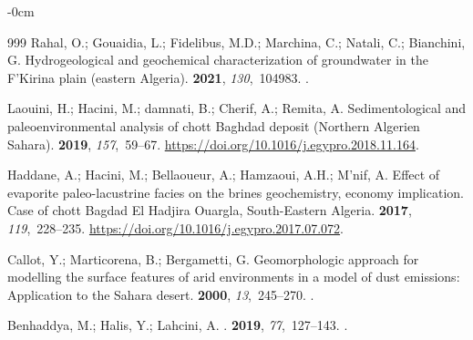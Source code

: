 \documentclass[asi,article,accept,pdftex,moreauthors]{Definitions/mdpi}
\begin{document}
\begin{adjustwidth}{-\extralength}{0cm}
\begin{thebibliography}{999}
Rahal, O.; Gouaidia, L.; Fidelibus, M.D.; Marchina, C.; Natali, C.; Bianchini,
  G.
\newblock Hydrogeological and geochemical characterization of groundwater in
  the F'Kirina plain (eastern Algeria).
 {\bf 2021}, {\em 130},~104983.
.

Laouini, H.; Hacini, M.; damnati, B.; Cherif, A.; Remita, A.
\newblock Sedimentological and paleoenvironmental analysis of chott Baghdad
  deposit (Northern Algerien Sahara).
 {\bf 2019}, {\em 157},~59--67. %
  {\url{https://doi.org/10.1016/j.egypro.2018.11.164}}.

Haddane, A.; Hacini, M.; Bellaoueur, A.; Hamzaoui, A.H.; M'nif, A.
\newblock Effect of evaporite paleo-lacustrine facies on the brines
  geochemistry, economy implication. Case of chott Bagdad El Hadjira Ouargla,
  South-Eastern Algeria.
 {\bf 2017}, {\em 119},~228--235. %
   {\url{https://doi.org/10.1016/j.egypro.2017.07.072}}.

Callot, Y.; Marticorena, B.; Bergametti, G.
\newblock Geomorphologic approach for modelling the surface features of arid
  environments in a model of dust emissions: Application to the Sahara desert.
 {\bf 2000}, {\em 13},~245--270.
.

Benhaddya, M.; Halis, Y.; Lahcini, A.
.
 {\bf
  2019}, {\em 77},~127--143.
.


\end{thebibliography}
\end{adjustwidth}
\end{document}
